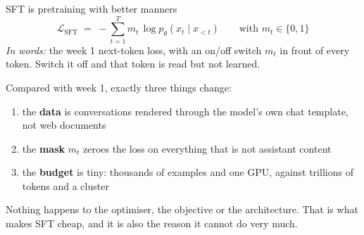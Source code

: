 \documentclass[aspectratio=169,10pt]{beamer}
\begin{document}
\begin{frame}{SFT is pretraining with better manners}
  \[
    \mathcal{L}_{\mathrm{SFT}} \;=\;
    -\sum_{t=1}^{T} m_t \,\log p_\theta\!\left(x_t \mid x_{<t}\right)
    \qquad\text{with } m_t \in \{0,1\}
  \]
  \emph{In words:} the week 1 next-token loss, with an on/off switch $m_t$ in
  front of every token. Switch it off and that token is read but not learned.
  \vspace{0.2em}

  Compared with week 1, exactly three things change:
  \vspace{0.4em}
  \begin{enumerate}
    \item the \textbf{data} is conversations rendered through the model's own
      chat template, not web documents
    \item the \textbf{mask} $m_t$ zeroes the loss on everything that is not
      assistant content
    \item the \textbf{budget} is tiny: thousands of examples and one GPU,
      against trillions of tokens and a cluster
  \end{enumerate}
  \vspace{0.5em}
  Nothing happens to the optimiser, the objective or the architecture. That is
  what makes SFT cheap, and it is also the reason it cannot do very much.
\end{frame}
\end{document}
